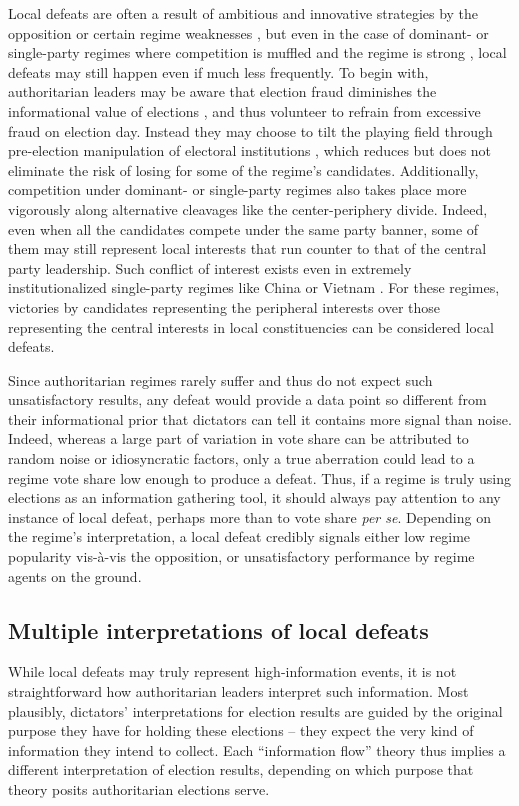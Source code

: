 \documentclass[12pt]{article}\usepackage[]{graphicx}\usepackage[]{color}
\newcommand{\1}{\mathbbm{1}}
\begin{document}
Local defeats are often a result of ambitious and innovative strategies by the opposition \citep{BunceWolchik2010} or certain regime weaknesses \citep{LevistkyWay2010}, but even in the case of dominant- or single-party regimes where competition is muffled \citep{Schedler2002} and the regime is strong \citep{BunceWolchik2010}, local defeats may still happen even if much less frequently. To begin with, authoritarian leaders may be aware that election fraud diminishes the informational value of elections \citep{Wintrobe2000}, and thus volunteer to refrain from excessive fraud on election day. Instead they may choose to tilt the playing field through pre-election manipulation of electoral institutions \citep{DiazMagaloni2001, Pepinsky2009, MaleskySchuler2011}, which reduces but does not eliminate the risk of losing for some of the regime's candidates. Additionally, competition under dominant- or single-party regimes also takes place more vigorously along alternative cleavages like the center-periphery divide. Indeed, even when all the candidates compete under the same party banner, some of them may still represent local interests that run counter to that of the central party leadership. Such conflict of interest exists even in extremely institutionalized single-party regimes like China \citep{Manion2014} or Vietnam \citep{MaleskySchuler2011}. For these regimes, victories by candidates representing the peripheral interests over those representing the central interests in local constituencies can be considered local defeats.
	
Since authoritarian regimes rarely suffer and thus do not expect such unsatisfactory results, any defeat would provide a data point so different from their informational prior that dictators can tell it contains more signal than noise. Indeed, whereas a large part of variation in vote share can be attributed to random noise or idiosyncratic factors, only a true aberration could lead to a regime vote share low enough to produce a defeat. Thus, if a regime is truly using elections as an information gathering tool, it should always pay attention to any instance of local defeat, perhaps more than to vote share \textit{per se}. Depending on the regime's interpretation, a local defeat credibly signals either low regime popularity vis-\`{a}-vis the opposition, or unsatisfactory performance by regime agents on the ground.

\subsection{Multiple interpretations of local defeats}
While local defeats may truly represent high-information events, it is not straightforward how authoritarian leaders interpret such information. Most plausibly, dictators' interpretations for election results are guided by the original purpose they have for holding these elections -- they expect the very kind of information they intend to collect. Each ``information flow'' theory thus implies a different interpretation of election results, depending on which purpose that theory posits authoritarian elections serve.
\end{document}
